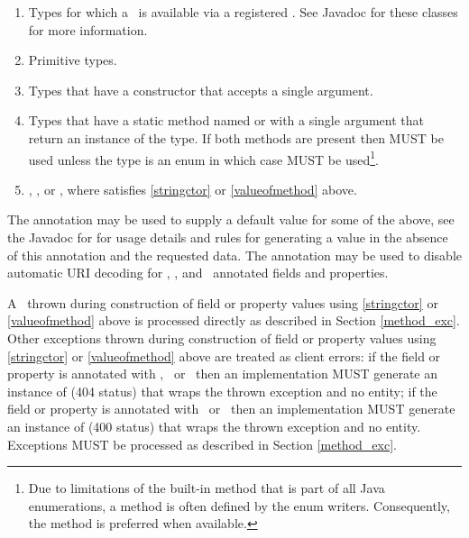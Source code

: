 \begin{enumerate}
\item Types for which a \ParamConverter\ is available via a registered \ParamConverterProvider. See Javadoc for these classes for more information.
\item Primitive types.
\item\label{stringctor} Types that have a constructor that accepts a single  argument.
\item\label{valueofmethod} Types that have a static method named  or  with a single  argument that return an instance of the type. If both methods are present then  MUST be used unless the type is an enum in which case  MUST be used\footnote{Due to limitations of the built-in  method that is part of all Java enumerations, a  method is often defined by the enum writers. Consequently, the  method is preferred when available.}.
\item {}, , or , where  satisfies \ref{stringctor} or \ref{valueofmethod} above.
\end{enumerate}

The  annotation may be used to supply a default value for some of the above, see the Javadoc for  for usage details and rules for generating a value in the absence of this annotation and the requested data. The  annotation may be used to disable automatic URI decoding for \MatrixParam, \QueryParam, and \PathParam\ annotated fields and properties.

A \WebAppExc\ thrown during construction of field or property values using \ref{stringctor} or \ref{valueofmethod} above is processed directly as described in Section \ref{method_exc}. Other exceptions thrown during construction of field or property values using \ref{stringctor} or \ref{valueofmethod} above are treated as client errors: if the field or property is annotated with \MatrixParam, \QueryParam\ or \PathParam\ then an implementation MUST generate an instance of  (404 status) that wraps the thrown exception and no entity; if the field or property is annotated with \HeaderParam\ or \CookieParam\ then an implementation MUST generate an instance of  (400 status) that wraps the thrown exception and no entity. Exceptions MUST be processed as described in Section \ref{method_exc}.

